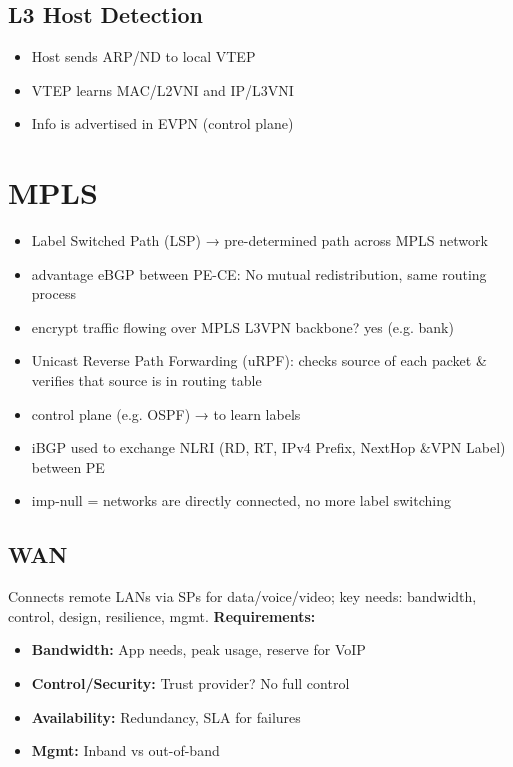 \begin{multicols*}{5}
		\subsection{L3 Host Detection}
		\begin{itemize}
			\item Host sends ARP/ND to local VTEP
			\item VTEP learns MAC/L2VNI and IP/L3VNI
			\item Info is advertised in EVPN (control plane)
		\end{itemize}
		
		\section{MPLS}
		\begin{itemize}
			\item Label Switched Path (LSP) → pre-determined path across MPLS network
			\item advantage eBGP between PE-CE: No mutual redistribution, same routing process
			\item encrypt traffic flowing over MPLS L3VPN backbone? yes (e.g. bank)
			\item Unicast Reverse Path Forwarding (uRPF): checks  source of each packet \& verifies that source is in routing table
			\item control plane (e.g. OSPF) → to learn labels
			\item iBGP used to exchange NLRI (RD, RT, IPv4 Prefix, NextHop \&VPN Label) between PE
			\item imp-null = networks are directly connected, no more label switching
		\end{itemize}
		
		\subsection{WAN}
		Connects remote LANs via SPs for data/voice/video; key needs: bandwidth, control, design, resilience, mgmt.\textbf{ Requirements:}
		\begin{itemize}
			\item \textbf{Bandwidth:} App needs, peak usage, reserve for VoIP
			\item \textbf{Control/Security:} Trust provider? No full control
			\item \textbf{Availability:} Redundancy, SLA for failures
			\item \textbf{Mgmt:} Inband vs out-of-band
		\end{itemize}

\end{multicols*}

